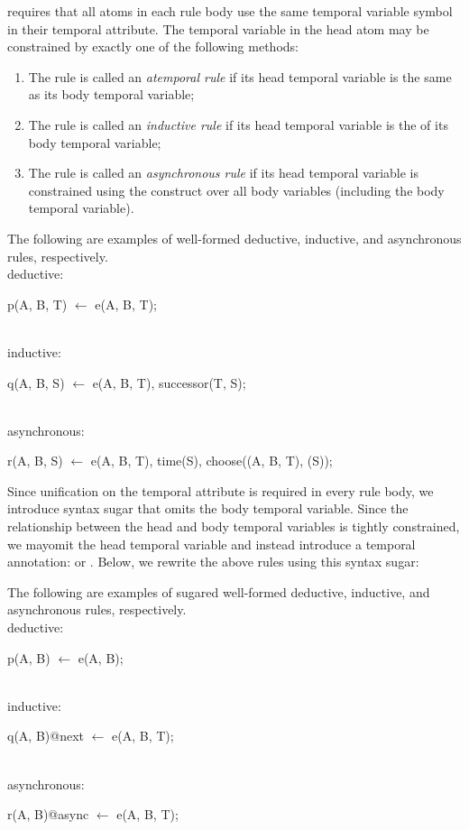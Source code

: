 \lang requires that all atoms in each rule body use the same temporal variable symbol in their temporal attribute.  The temporal variable in the head atom may be constrained by exactly one of the following methods:

\begin{enumerate}
\item The rule is called an {\em atemporal rule} if its head temporal variable is the same as its body temporal variable;
\item The rule is called an {\em inductive rule} if its head temporal variable is the  of its body temporal variable;
\item The rule is called an {\em asynchronous rule} if its head temporal variable is constrained using the  construct over all body variables (including the body temporal variable).
\end{enumerate}

\begin{example}
The following are examples of well-formed deductive, inductive, and asynchronous rules, respectively.
\\
deductive:
\begin{Dedalus}
p(A, B, T) \(\leftarrow\) e(A, B, T);
\end{Dedalus}
\\
inductive:
\begin{Dedalus}
q(A, B, S) \(\leftarrow\) e(A, B, T), successor(T, S);
\end{Dedalus}
\\
asynchronous:
\begin{Dedalus}
r(A, B, S) \(\leftarrow\) e(A, B, T), time(S), choose((A, B, T), (S));
\end{Dedalus}
\end{example}

Since unification on the temporal attribute is required in every rule body, we introduce syntax sugar that omits the body temporal variable.  Since the relationship between the head and body temporal variables is tightly constrained, we mayomit the head temporal variable and instead introduce a temporal annotation:  or .  Below, we rewrite the above rules using this syntax sugar:

\begin{example}
The following are examples of sugared well-formed deductive, inductive, and asynchronous rules, respectively.
\\
deductive:
\begin{Dedalus}
p(A, B) \(\leftarrow\) e(A, B);
\end{Dedalus}
\\
inductive:
\begin{Dedalus}
q(A, B)@next \(\leftarrow\) e(A, B, T);
\end{Dedalus}
\\
asynchronous:
\begin{Dedalus}
r(A, B)@async \(\leftarrow\) e(A, B, T);
\end{Dedalus}
\end{example}


